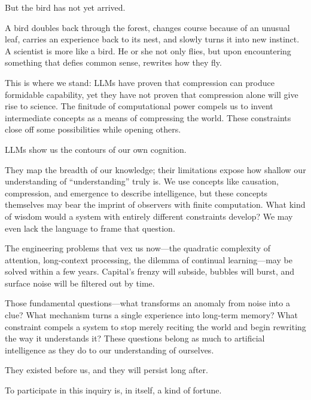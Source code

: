 \vspace{1em}

But the bird has not yet arrived.

A bird doubles back through the forest, changes course because of an unusual leaf, carries an experience back to its nest, and slowly turns it into new instinct. A scientist is more like a bird. He or she not only flies, but upon encountering something that defies common sense, rewrites how they fly.

This is where we stand:
LLMs have proven that compression can produce formidable capability, yet they have not proven that compression alone will give rise to science. The finitude of computational power compels us to invent intermediate concepts as a means of compressing the world. These constraints close off some possibilities while opening others.

\vspace{1em}

LLMs show us the contours of our own cognition.

They map the breadth of our knowledge; their limitations expose how shallow our understanding of ``understanding'' truly is. We use concepts like causation, compression, and emergence to describe intelligence, but these concepts themselves may bear the imprint of observers with finite computation. What kind of wisdom would a system with entirely different constraints develop? We may even lack the language to frame that question.

\vspace{1em}

The engineering problems that vex us now---the quadratic complexity of attention, long-context processing, the dilemma of continual learning---may be solved within a few years.
Capital's frenzy will subside, bubbles will burst, and surface noise will be filtered out by time.

\vspace{1em}

Those fundamental questions---what transforms an anomaly from noise into a clue? What mechanism turns a single experience into long-term memory? What constraint compels a system to stop merely reciting the world and begin rewriting the way it understands it?
These questions belong as much to artificial intelligence as they do to our understanding of ourselves.

\vspace{1em}

They existed before us, and they will persist long after.

To participate in this inquiry is, in itself, a kind of fortune.
